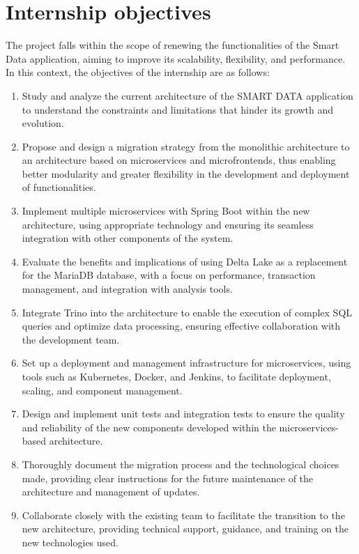 \section{Internship objectives}

The project falls within the scope of renewing the functionalities of the Smart Data application, aiming to improve its scalability, flexibility, and performance. In this context, the objectives of the internship are as follows:

\begin{enumerate}
\item Study and analyze the current architecture of the SMART DATA application to understand the constraints and limitations that hinder its growth and evolution.
\item Propose and design a migration strategy from the monolithic architecture to an architecture based on microservices and microfrontends, thus enabling better modularity and greater flexibility in the development and deployment of functionalities.
\item Implement multiple microservices with Spring Boot within the new architecture, using appropriate technology and ensuring its seamless integration with other components of the system.
\item Evaluate the benefits and implications of using Delta Lake as a replacement for the MariaDB database, with a focus on performance, transaction management, and integration with analysis tools.
\item Integrate Trino into the architecture to enable the execution of complex SQL queries and optimize data processing, ensuring effective collaboration with the development team.
\item Set up a deployment and management infrastructure for microservices, using tools such as Kubernetes, Docker, and Jenkins, to facilitate deployment, scaling, and component management.
\item Design and implement unit tests and integration tests to ensure the quality and reliability of the new components developed within the microservices-based architecture.
\item Thoroughly document the migration process and the technological choices made, providing clear instructions for the future maintenance of the architecture and management of updates.
\item Collaborate closely with the existing team to facilitate the transition to the new architecture, providing technical support, guidance, and training on the new technologies used.
\end{enumerate}

